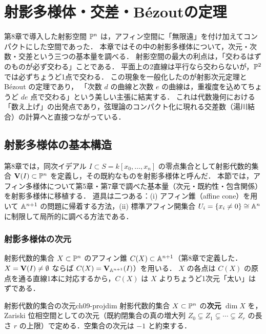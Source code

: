 \chapter{射影多様体・交差・B\'ezoutの定理}
\label{ch:ch09}

\begin{chapterlead}
第8章で導入した射影空間 $\mathbb{P}^n$ は，アフィン空間に「無限遠」を付け加えてコンパクトにした空間であった．
本章ではその中の射影多様体について，次元・次数・交差という三つの基本量を調べる．
射影空間の最大の利点は，「交わるはずのものが必ず交わる」ことである．
平面上の2直線は平行なら交わらないが，$\mathbb{P}^2$ では必ずちょうど1点で交わる．
この現象を一般化したのが射影次元定理と B\'ezout の定理であり，
「次数 $d$ の曲線と次数 $e$ の曲線は，重複度を込めてちょうど $de$ 点で交わる」という美しい主張に結実する．
これは代数幾何における「数え上げ」の出発点であり，弦理論のコンパクト化に現れる交差数（湯川結合）の計算へと直接つながっている．
\end{chapterlead}

\section{射影多様体の基本構造}

第8章では，同次イデアル $I\subset S=k[x_0,\dots,x_n]$ の零点集合として射影代数的集合 $\mathbf{V}(I)\subset\mathbb{P}^n$ を定義し，その既約なものを射影多様体と呼んだ．
本節では，アフィン多様体について第5章・第7章で調べた基本量（次元・既約性・包含関係）を射影多様体に移植する．
道具は二つある：(i) アフィン錐（affine cone）を用いて $\mathbb{A}^{n+1}$ の問題に帰着する方法，(ii) 標準アフィン開集合 $U_i=\{x_i\neq 0\}\cong\mathbb{A}^n$ に制限して局所的に調べる方法である．

\subsection{射影多様体の次元}

射影代数的集合 $X\subset\mathbb{P}^n$ のアフィン錐 $C(X)\subset\mathbb{A}^{n+1}$（第8章で定義した．$X=\mathbf{V}(I)\neq\emptyset$ ならば $C(X)=\mathbf{V}_{\mathbb{A}^{n+1}}(I)$）を用いる．
$X$ の各点は $C(X)$ の原点を通る直線1本に対応するから，$C(X)$ は $X$ よりちょうど1次元「太い」はずである．

\begin{mydef}{射影代数的集合の次元}{ch09-projdim}
射影代数的集合 $X\subset\mathbb{P}^n$ の\textbf{次元} $\dim X$ を，Zariski 位相空間としての次元（既約閉集合の真の増大列 $Z_0\subsetneq Z_1\subsetneq\cdots\subsetneq Z_r$ の長さ $r$ の上限）で定める．空集合の次元は $-1$ と約束する．
\end{mydef}


